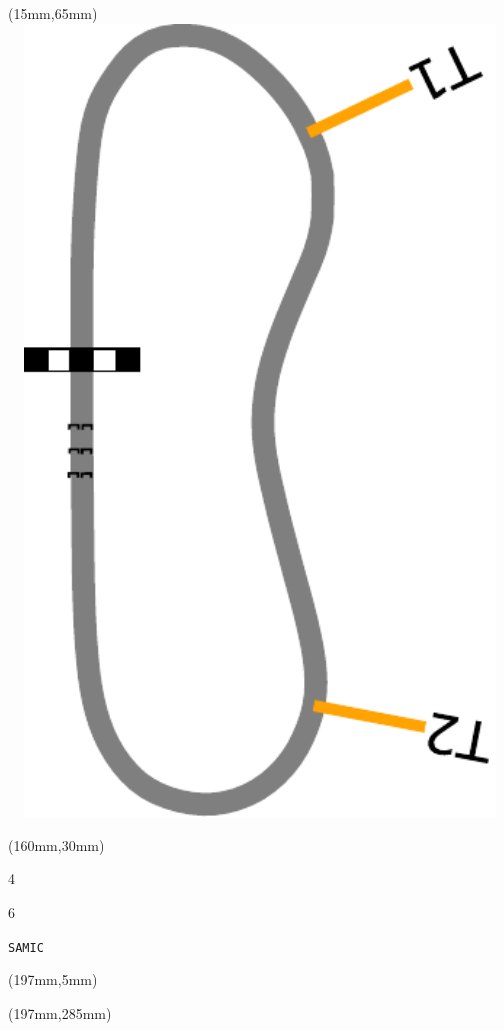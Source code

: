 \begin{textblock*}{185mm}(15mm,65mm)%
\centering
\mbox{\includegraphics[width=185mm,height=210mm,keepaspectratio]{PT/SAMIC.pdf}}
\end{textblock*}
\begin{textblock*}{40mm}(160mm,30mm)%
\Large
\par{} 
\par4 
\par6 
\par\hfill\tiny\tt SAMIC\\
\end{textblock*}
\begin{textblock*}{20mm}(197mm,5mm)%
\fbox{\thepage}
\label{SAMIC}
\end{textblock*}
\begin{textblock*}{20mm}(197mm,285mm)%
\fbox{\thepage}
\end{textblock*}

